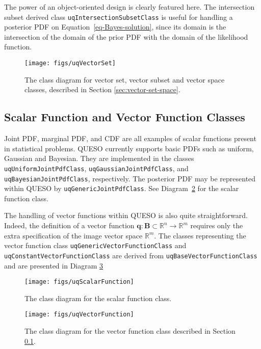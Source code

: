 The power of an object-oriented design is clearly featured here.
The intersection subset derived class \verb+uqIntersectionSubsetClass+ is useful for handling a posterior PDF  on Equation~\eqref{eq-Bayes-solution},
since its domain is the intersection of the domain of the prior PDF with the domain of the likelihood function.

\begin{figure}[htpb]
\centering
\texttt{[image: figs/uqVectorSet]}
\vspace*{-8pt}
\caption{The class diagram for vector set, vector subset and vector space classes, described in Section \ref{sec:vector-set-space}.}
\label{fig-vector-space-subset-classes}
\end{figure}

\subsection{Scalar Function and Vector Function Classes}\label{sec:scalar-vector-function}

Joint PDF, marginal PDF, and CDF are all examples of scalar functions present in statistical problems. 
QUESO currently supports basic PDFs such as uniform, Gaussian and Bayesian. They are implemented in the classes \verb+uqUniformJointPdfClass+, \verb+uqGaussianJointPdfClass+, and \verb+uqBayesianJointPdfClass+, respectively. The posterior PDF may be represented within QUESO by \verb+uqGenericJointPdfClass+.
See Diagram~\ref{fig-scalar-function-class} for the scalar function class.

The handling of vector functions within QUESO is also quite straightforward. Indeed, the definition of a vector function $\mathbf{q}:\mathbf{B}\subset\mathbb{R}^n\rightarrow\mathbb{R}^m$ requires only the extra specification of the image vector space $\mathbb{R}^m$. The classes representing the vector function class \verb+uqGenericVectorFunctionClass+ and \verb+uqConstantVectorFunctionClass+ are derived  from \verb+uqBaseVectorFunctionClass+ and are presented in Diagram \ref{fig-vector-function-class} 
\begin{figure}[htpb]
\centering
\texttt{[image: figs/uqScalarFunction]}
\vspace{-6pt}
\caption{The class diagram for the scalar function class.}
\label{fig-scalar-function-class}
\end{figure}

\begin{figure}[htpb]
\centering
\texttt{[image: figs/uqVectorFunction]}
\vspace{-18pt}
\caption{The class diagram for the vector function class described in Section \ref{sec:scalar-vector-function}.} %
\label{fig-vector-function-class}
\end{figure}

